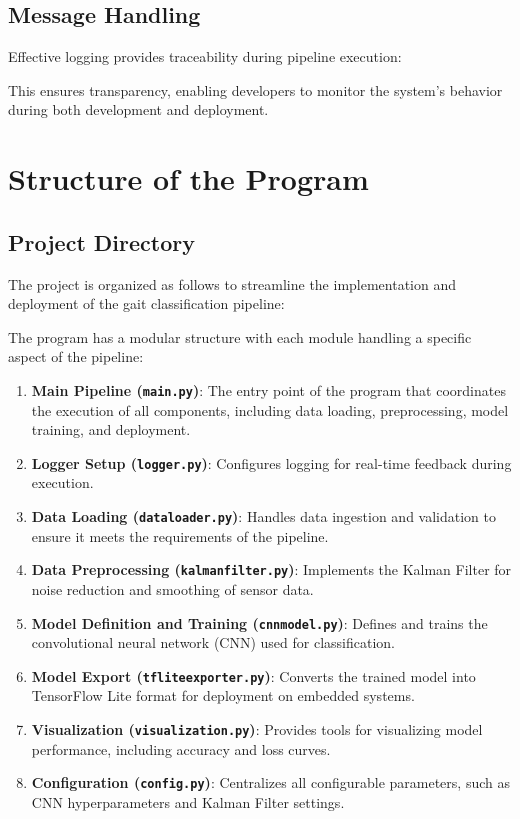 \subsection{Message Handling}
Effective logging provides traceability during pipeline execution:

This ensures transparency, enabling developers to monitor the system's behavior during both development and deployment.






\section{Structure of the Program}

\subsection{Project Directory }
The project is organized as follows to streamline the implementation and deployment of the gait classification pipeline:



\lstset{style=pythonstyle}


The program has a modular structure with each module handling a specific aspect of the pipeline:

\begin{enumerate}
    \item \textbf{Main Pipeline (\texttt{main.py})}: The entry point of the program that coordinates the execution of all components, including data loading, preprocessing, model training, and deployment.
    \item \textbf{Logger Setup (\texttt{logger.py})}: Configures logging for real-time feedback during execution.
    \item \textbf{Data Loading (\texttt{dataloader.py})}: Handles data ingestion and validation to ensure it meets the requirements of the pipeline.
    \item \textbf{Data Preprocessing (\texttt{kalmanfilter.py})}: Implements the Kalman Filter for noise reduction and smoothing of sensor data.
    \item \textbf{Model Definition and Training (\texttt{cnnmodel.py})}: Defines and trains the convolutional neural network (CNN) used for classification.
    \item \textbf{Model Export (\texttt{tfliteexporter.py})}: Converts the trained model into TensorFlow Lite format for deployment on embedded systems.
    \item \textbf{Visualization (\texttt{visualization.py})}: Provides tools for visualizing model performance, including accuracy and loss curves.
    \item \textbf{Configuration (\texttt{config.py})}: Centralizes all configurable parameters, such as CNN hyperparameters and Kalman Filter settings.
\end{enumerate}

